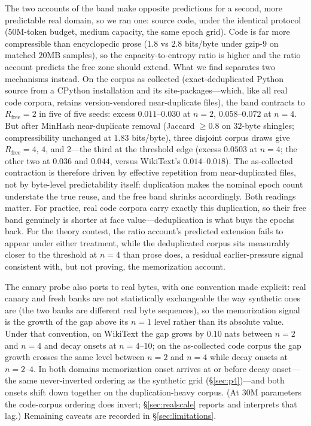 \documentclass[11pt]{article}
\begin{document}
The two accounts of the band make opposite predictions for a second, more predictable
real domain, so we ran one: source code, under the identical protocol
($50$M-token budget, medium capacity, the same epoch grid). Code is far more
compressible than encyclopedic prose ($1.8$ vs $2.8$ bits/byte under gzip-9 on matched
$20$MB samples), so the capacity-to-entropy ratio is higher and the ratio account
predicts the free zone should extend. What we find separates two mechanisms instead.
On the corpus as collected (exact-deduplicated Python source from a CPython
installation and its site-packages---which, like all real code corpora, retains
version-vendored near-duplicate files), the band contracts to $R_{\mathrm{free}}=2$ in
five of five seeds: excess $0.011$--$0.030$ at $n=2$, $0.058$--$0.072$ at $n=4$. But
after MinHash near-duplicate removal (Jaccard $\geq0.8$ on $32$-byte shingles;
compressibility unchanged at $1.83$ bits/byte), three disjoint corpus draws give
$R_{\mathrm{free}}=4$, $4$, and $2$---the third at the threshold edge (excess $0.0503$
at $n=4$; the other two at $0.036$ and $0.044$, versus WikiText's $0.014$--$0.018$).
The as-collected contraction is therefore driven by effective repetition from
near-duplicated files, not by byte-level predictability itself: duplication makes the
nominal epoch count understate the true reuse, and the free band shrinks accordingly.
Both readings matter. For practice, real code corpora carry exactly this duplication,
so their free band genuinely is shorter at face value---deduplication is what buys the
epochs back. For the theory contest, the ratio account's predicted extension fails to
appear under either treatment, while the deduplicated corpus sits measurably closer to
the threshold at $n=4$ than prose does, a residual earlier-pressure signal consistent
with, but not proving, the memorization account.

The canary probe also ports to real bytes, with one convention made explicit: real
canary and fresh banks are not statistically exchangeable the way synthetic ones are
(the two banks are different real byte sequences), so the memorization signal is the
growth of the gap above its $n{=}1$ level rather than its absolute value. Under that
convention, on WikiText the gap grows by $0.10$ nats between $n=2$ and $n=4$ and decay
onsets at $n=4$--$10$; on the as-collected code corpus the gap growth crosses the same
level between $n=2$ and $n=4$ while decay onsets at $n=2$--$4$. In both domains
memorization onset arrives at or before decay onset---the same never-inverted ordering
as the synthetic grid (\S\ref{sec:p4})---and both onsets shift down together on the
duplication-heavy corpus. (At $30$M parameters the code-corpus ordering does
invert; \S\ref{sec:realscale} reports and interprets that lag.) Remaining caveats
are recorded in \S\ref{sec:limitations}.
\end{document}
